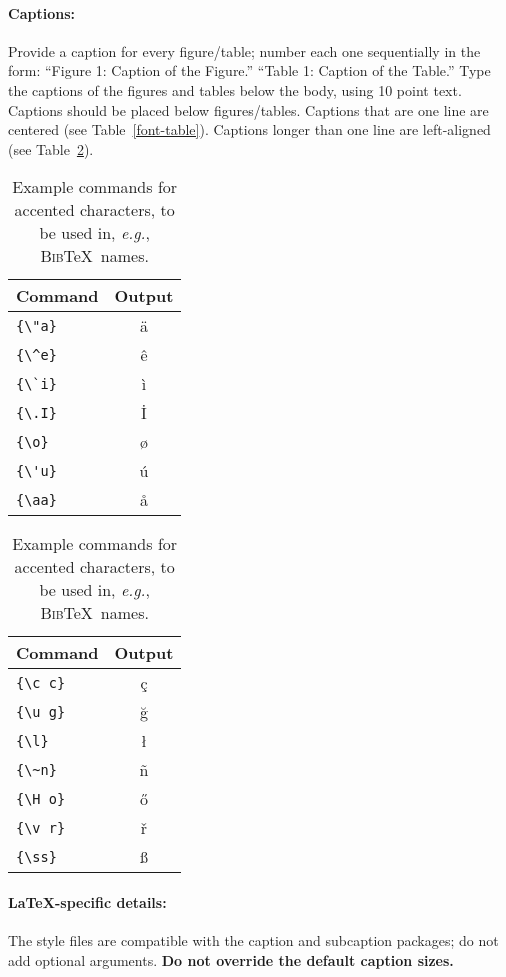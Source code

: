 \documentclass[11pt,a4paper]{article}
\newcommand\BibTeX{B\textsc{ib}\TeX}
\begin{document}
\paragraph{Captions:}
Provide a caption for every figure/table; number each one sequentially in the form:
``Figure 1: Caption of the Figure.''
``Table 1: Caption of the Table.''
Type the captions of the figures and tables below the body, using 10 point text.
Captions should be placed below figures/tables.
Captions that are one line are centered (see Table~\ref{font-table}).
Captions longer than one line are left-aligned (see Table~\ref{tab:accents}).

\begin{table}
\centering
\begin{tabular}{lc}
\hline
\textbf{Command} & \textbf{Output}\\
\hline
\verb|{\"a}| & {\"a} \\
\verb|{\^e}| & {\^e} \\
\verb|{\`i}| & {\`i} \\ 
\verb|{\.I}| & {\.I} \\ 
\verb|{\o}| & {\o} \\
\verb|{\'u}| & {\'u}  \\ 
\verb|{\aa}| & {\aa}  \\\hline
\end{tabular}
\begin{tabular}{lc}
\hline
\textbf{Command} & \textbf{Output}\\
\hline
\verb|{\c c}| & {\c c} \\ 
\verb|{\u g}| & {\u g} \\ 
\verb|{\l}| & {\l} \\ 
\verb|{\~n}| & {\~n} \\ 
\verb|{\H o}| & {\H o} \\ 
\verb|{\v r}| & {\v r} \\ 
\verb|{\ss}| & {\ss} \\
\hline
\end{tabular}
\caption{Example commands for accented characters, to be used in, \emph{e.g.}, \BibTeX\ names.}\label{tab:accents}
\end{table}

\paragraph{\LaTeX-specific details:}
The style files are compatible with the caption and subcaption packages; do not add optional arguments.
\textbf{Do not override the default caption sizes.}
\end{document}
